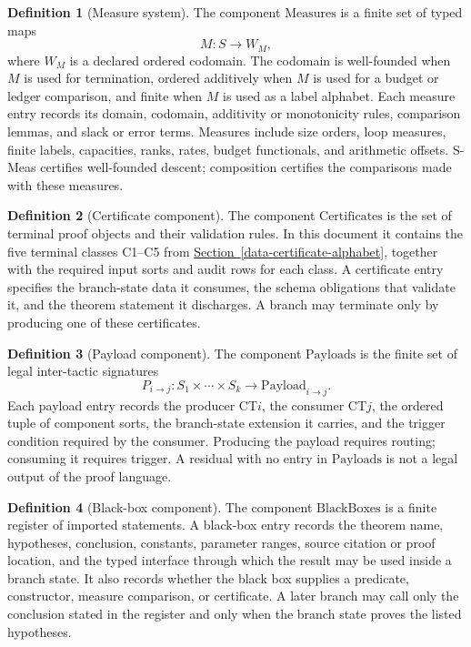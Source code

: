 \documentclass[
  11pt,
]{article}
\theoremstyle{definition}
\newtheorem{definition}{Definition}[section]
\newcommand{\secref}[1]{\hyperref[#1]{Section~\ref*{#1}}}
\begin{document}
\begin{definition}[Measure system]\label{def:proof-language-measures}
The component \(\mathrm{Measures}\) is a finite set of typed maps
\[
M:S\longrightarrow W_M,
\]
where \(W_M\) is a declared ordered codomain.  The codomain is
well-founded when \(M\) is used for termination, ordered additively when
\(M\) is used for a budget or ledger comparison, and finite when \(M\)
is used as a label alphabet.  Each measure entry records its domain,
codomain, additivity or monotonicity rules, comparison lemmas, and slack
or error terms.  Measures include size orders, loop measures, finite
labels, capacities, ranks, rates, budget functionals, and arithmetic
offsets.  S-Meas certifies well-founded descent; composition certifies the
comparisons made with these measures.
\end{definition}

\begin{definition}[Certificate component]\label{def:proof-language-certificates}
The component \(\mathrm{Certificates}\) is the set of terminal proof
objects and their validation rules.  In this document it contains the
five terminal classes C1--C5 from \secref{data-certificate-alphabet},
together with the required input sorts and audit rows for each class.
A certificate entry specifies the branch-state data it consumes, the
schema obligations that validate it, and the theorem statement it
discharges.  A branch may terminate only by producing one of these
certificates.
\end{definition}

\begin{definition}[Payload component]\label{def:proof-language-payloads}
The component \(\mathrm{Payloads}\) is the finite set of legal
inter-tactic signatures
\[
P_{i\to j}:S_1\times\cdots\times S_k\longrightarrow
\mathrm{Payload}_{i\to j}.
\]
Each payload entry records the producer CT\(i\), the consumer CT\(j\),
the ordered tuple of component sorts, the branch-state extension it
carries, and the trigger condition required by the consumer.  Producing
the payload requires routing; consuming it requires trigger.  A residual
with no entry in \(\mathrm{Payloads}\) is not a legal output of the
proof language.
\end{definition}

\begin{definition}[Black-box component]\label{def:proof-language-blackboxes}
The component \(\mathrm{BlackBoxes}\) is a finite register of imported
statements.  A black-box entry records the theorem name, hypotheses,
conclusion, constants, parameter ranges, source citation or proof
location, and the typed interface through which the result may be used
inside a branch state.  It also records whether the black box supplies a
predicate, constructor, measure comparison, or certificate.  A later
branch may call only the conclusion stated in the register and only when
the branch state proves the listed hypotheses.
\end{definition}
\end{document}
